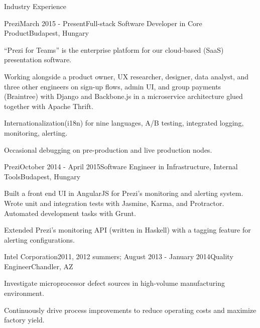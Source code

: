 \documentclass{resume} %
\begin{document}
\begin{rSection}{Industry Experience}

\begin{rSubsection}{Prezi}{March 2015 - Present}{Full-stack Software Developer in Core Product}{Budapest, Hungary}
\item ``Prezi for Teams'' is the enterprise platform for our cloud-based (SaaS) presentation software.
\item Working alongside a product owner, UX researcher, designer, data analyst, and three other engineers on sign-up flows, admin UI, and group payments (Braintree) with Django and Backbone.js in a microservice architecture glued together with Apache Thrift.
\item Internationalization(i18n) for nine languages, A/B testing, integrated logging, monitoring, alerting.
\item Occasional debugging on pre-production and live production nodes.
\end{rSubsection}


\begin{rSubsection}{Prezi}{October 2014 - April 2015}{Software Engineer in Infrastructure, Internal Tools}{Budapest, Hungary}
\item Built a front end UI in AngularJS for Prezi’s monitoring and alerting system. Wrote unit and integration tests with Jasmine, Karma, and Protractor. Automated development tasks with Grunt.
\item Extended Prezi's monitoring API (written in Haskell) with a tagging feature for alerting configurations.
\end{rSubsection}


\begin{rSubsection}{Intel Corporation}{2011, 2012 summers; August 2013 - January 2014}{Quality Engineer}{Chandler, AZ}
\item Investigate microprocessor defect sources in high-volume manufacturing environment. 
\item Continuously drive process improvements to reduce operating costs and maximize factory yield.
\end{rSubsection}

\end{rSection}
\end{document}
